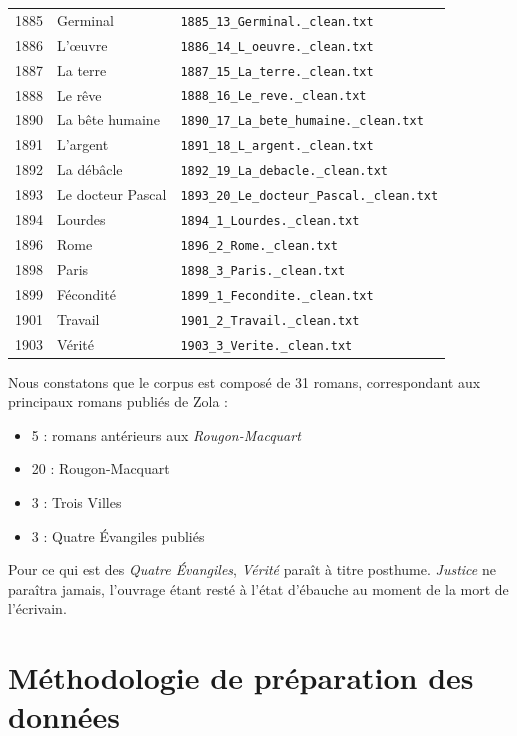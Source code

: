\documentclass{article}
\begin{document}
\begin{longtable}{p{1.6cm}p{4.2cm}p{8cm}}
1885 & Germinal & \texttt{1885\_13\_Germinal.\_clean.txt} \\
1886 & L'œuvre & \texttt{1886\_14\_L\_oeuvre.\_clean.txt} \\
1887 & La terre & \texttt{1887\_15\_La\_terre.\_clean.txt} \\
1888 & Le rêve & \texttt{1888\_16\_Le\_reve.\_clean.txt} \\
1890 & La bête humaine & \texttt{1890\_17\_La\_bete\_humaine.\_clean.txt} \\
1891 & L'argent & \texttt{1891\_18\_L\_argent.\_clean.txt} \\
1892 & La débâcle & \texttt{1892\_19\_La\_debacle.\_clean.txt} \\
1893 & Le docteur Pascal & \texttt{1893\_20\_Le\_docteur\_Pascal.\_clean.txt} \\
1894 & Lourdes & \texttt{1894\_1\_Lourdes.\_clean.txt} \\
1896 & Rome & \texttt{1896\_2\_Rome.\_clean.txt} \\
1898 & Paris & \texttt{1898\_3\_Paris.\_clean.txt} \\
1899 & Fécondité & \texttt{1899\_1\_Fecondite.\_clean.txt} \\
1901 & Travail & \texttt{1901\_2\_Travail.\_clean.txt} \\
1903 & Vérité & \texttt{1903\_3\_Verite.\_clean.txt} \\

\bottomrule
\end{longtable}

Nous constatons que le corpus est composé de 31 romans, correspondant aux principaux romans publiés de Zola :
\vspace{0.3cm}
\begin{itemize}
    \item 5 : romans antérieurs aux \textit{Rougon-Macquart}
    \item  20 :  Rougon-Macquart
    \item  3 : Trois Villes
    \item  3 : Quatre Évangiles publiés
    
\end{itemize}
\vspace{0.3cm}
Pour ce qui est des \textit{Quatre Évangiles}, \textit{Vérité} paraît à titre posthume. \textit{Justice} ne paraîtra jamais, l'ouvrage étant resté à l'état d'ébauche au moment de la mort de l'écrivain. 
\newpage
\section{Méthodologie de préparation des données}
\end{document}
